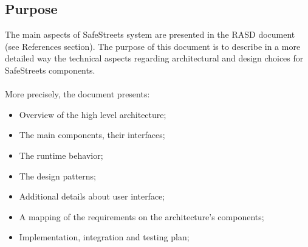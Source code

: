 \documentclass{article}
\begin{document}
		\subsection{Purpose}
		The main aspects of SafeStreets system are presented in the RASD document (see References section). The purpose of this document is to describe in a more detailed way the technical aspects regarding architectural and design choices for SafeStreets components.\\\\
		More precisely, the document presents:
		\begin{itemize}
			\item Overview of the high level architecture;
			\item The main components, their interfaces; 
			\item The runtime behavior; 
			\item The design patterns;
			\item Additional details about user interface;
			\item A mapping of the requirements on the architecture's components;
			\item Implementation, integration and testing plan;
		\end{itemize}
\end{document}
